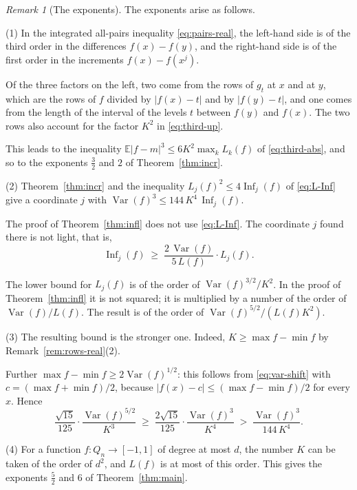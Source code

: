 \documentclass[11pt,reqno]{amsart}
\makeatletter
\theoremstyle{definition}
\theoremstyle{remark}
\newtheorem{remark}[theorem]{Remark}
\numberwithin{equation}{section}
\theoremstyle{named}
\theoremstyle{plain}
\renewcommand{\section}{\@startsection{section}{1}%
  \z@{1.3\linespacing\@plus.7\linespacing}{.65\linespacing}{\normalfont\scshape\centering}}
\newcommand{\E}{\mathbb{E}}
\newcommand{\Var}{\operatorname{Var}}
\newcommand{\Inf}{\operatorname{Inf}}
\newcommand{\abs}[1]{\lvert #1\rvert}
\makeatother
\begin{document}
\begin{remark}[The exponents]\label{rem:exponents}
The exponents arise as follows.

(1) In the integrated all-pairs inequality \eqref{eq:pairs-real}, the left-hand side is of the
third order in the differences $f(x)-f(y)$, and the right-hand side is of the first order in the
increments $f(x)-f(x^{j})$.

Of the three factors on the left, two come from the rows of $g_t$ at
$x$ and at $y$, which are the rows of $f$ divided by $\abs{f(x)-t}$ and by $\abs{f(y)-t}$, and
one comes from the length of the interval of the levels $t$ between $f(y)$ and $f(x)$. The two
rows also account for the factor $K^{2}$ in \eqref{eq:third-up}.

This leads to the inequality
$\E\abs{f-m}^{3}\le6K^{2}\max_kL_k(f)$ of \eqref{eq:third-abs}, and so to the exponents $\frac32$
and $2$ of Theorem~\ref{thm:incr}.

(2) Theorem~\ref{thm:incr} and the inequality $L_j(f)^{2}\le4\Inf_j(f)$ of \eqref{eq:L-Inf} give
a coordinate $j$ with $\Var(f)^{3}\le144\,K^{4}\,\Inf_j(f)$.

The proof of
Theorem~\ref{thm:infl} does not use \eqref{eq:L-Inf}. The coordinate $j$ found there is not
light, that is,
\[
   \Inf_j(f)\;\ge\;\frac{2\,\Var(f)}{5\,L(f)}\cdot L_j(f).
\]

The lower bound for $L_j(f)$ is of the order of $\Var(f)^{3/2}/K^{2}$. In the proof of
Theorem~\ref{thm:infl} it is not squared; it is multiplied by a number of the order of
$\Var(f)/L(f)$. The result is of the order of $\Var(f)^{5/2}/(L(f)K^{2})$.

(3) The resulting bound is the stronger one. Indeed, $K\ge\max f-\min f$ by
Remark~\ref{rem:rows-real}(2).

Further $\max f-\min f\ge2\Var(f)^{1/2}$: this follows from
\eqref{eq:var-shift} with $c=(\max f+\min f)/2$, because $\abs{f(x)-c}\le(\max f-\min f)/2$ for
every $x$. Hence
\[
   \frac{\sqrt{15}}{125}\cdot\frac{\Var(f)^{5/2}}{K^{3}}
   \;\ge\;\frac{2\sqrt{15}}{125}\cdot\frac{\Var(f)^{3}}{K^{4}}
   \;>\;\frac{\Var(f)^{3}}{144\,K^{4}} .
\]

(4) For a function $f\colon Q_n\to[-1,1]$ of degree at most $d$, the number $K$ can be taken of
the order of $d^{2}$, and $L(f)$ is at most of this order. This gives the exponents $\frac52$ and
$6$ of Theorem~\ref{thm:main}.
\end{remark}

\section{Remarks and open questions}\label{sec:remarks}
\end{document}
